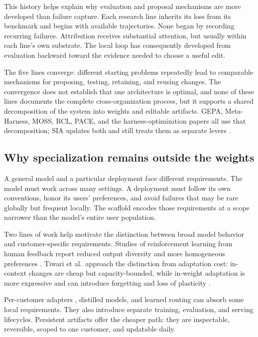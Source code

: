 This history helps explain why evaluation and proposal mechanisms are more developed than failure capture. Each research line inherits its loss from its benchmark and begins with available trajectories. None began by recording recurring failures. Attribution receives substantial attention, but usually within each line's own substrate. The local loop has consequently developed from evaluation backward toward the evidence needed to choose a useful edit.

The five lines converge: different starting problems repeatedly lead to comparable mechanisms for proposing, testing, retaining, and reusing changes. The convergence does not establish that one architecture is optimal, and none of these lines documents the complete cross-organization process, but it supports a shared decomposition of the system into weights and editable artifacts. GEPA, Meta-Harness, MOSS, RCL, PACE, and the harness-optimization papers all use that decomposition; SIA updates both and still treats them as separate levers \cite{hebbar2026sia}.

\subsection{Why specialization remains outside the weights}\label{sec:why}

A general model and a particular deployment face different requirements. The model must work across many settings. A deployment must follow its own conventions, honor its users' preferences, and avoid failures that may be rare globally but frequent locally. The scaffold encodes those requirements at a scope narrower than the model's entire user population.

Two lines of work help motivate the distinction between broad model behavior and customer-specific requirements. Studies of reinforcement learning from human feedback report reduced output diversity and more homogeneous preferences \cite{kirk2024understanding, padmakumar2023diversity}. Tiwari et al.~approach the distinction from adaptation cost: in-context changes are cheap but capacity-bounded, while in-weight adaptation is more expressive and can introduce forgetting and loss of plasticity \cite{tiwari2026fastandslow, dohare2024loss}.

Per-customer adapters \cite{hu2021lora}, distilled models, and learned routing can absorb some local requirements. They also introduce separate training, evaluation, and serving lifecycles. Persistent artifacts offer the cheaper path: they are inspectable, reversible, scoped to one customer, and updatable daily.

